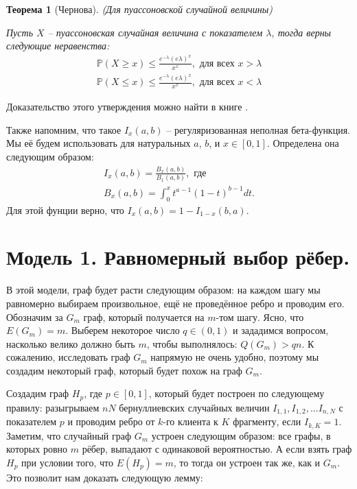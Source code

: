 \documentclass{matmex-diploma-custom}
\newcommand{\PRob}{\mathbb P}
\newcommand{\leqs}{\leqslant}
\newcommand{\geqs}{\geqslant}
\theoremstyle{named}
\newtheorem*{namedtheorem}{Теорема}
\begin{document}
\begin{namedtheorem}[Чернова] (Для пуассоновской случайной величины)

Пусть $X$ -- пуассоновская случайная величина с показателем $\lambda$, тогда верны следующие неравенства:
\begin{align} \label{gr_1}
\PRob(X \geqs x) \leqs \frac{e^{-\lambda}(e\lambda)^x}{x^x}, \text{ для всех } x > \lambda 
\\
\label{gr_2}
\PRob(X \leqs x) \leqs \frac{e^{-\lambda}(e\lambda)^x}{x^x}, \text{ для всех } x < \lambda 
\end{align}
\end{namedtheorem}
Доказательство этого утверждения можно найти в книге \cite{chernov_gr}.

\medskip

Также напомним, что такое $I_x(a,b)$ -- регуляризованная неполная бета-функция. 
Мы её будем использовать для натуральных $a$, $b$, и $x \in [0,1]$.
Определена она следующим образом:
\begin{equation} \label{i_x} \begin{aligned}
I_x(a,b) = \frac{B_x(a,b)}{B_1(a,b)}, \text{ где } 
\\
B_x(a,b) = \int_0^x t^{a-1} (1-t)^{b-1} dt.
\end{aligned}\end{equation}
Для этой фунции верно, что $I_x(a,b) = 1 - I_{1-x}(b, a)$.


\newpage
\section*{Модель 1. Равномерный выбор рёбер.}
В этой модели, граф будет расти следующим образом: на каждом шагу мы равномерно выбираем произвольное, ещё не проведённое ребро 
и проводим его. Обозначим за $G_m$ граф, который получается на $m$-том шагу. Ясно, что $E(G_m) = m$.
Выберем некоторое число $q \in (0, 1)$ и зададимся вопросом, насколько велико должно быть $m$, чтобы выполнялось: $Q(G_m) > qn$.
К сожалению, исследовать граф $G_m$ напрямую не очень удобно, поэтому мы создадим некоторый граф, который будет похож на граф $G_m$.

Создадим граф $H_p$, где $p \in [0, 1]$, который будет построен по следующему правилу: 
разыгрываем $nN$ бернуллиевских случайных величин $I_{1,1}, I_{1,2}, \dots I_{n,N}$ с показателем $p$ и проводим ребро от $k$-го клиента к $K$ фрагменту, 
если $I_{k, K} = 1$.
Заметим, что случайный граф $G_m$ устроен следующим образом: все графы, в которых ровно $m$ рёбер, выпадают с одинаковой вероятностью.
А если взять граф $H_p$ при условии того, что $E(H_p) = m$, то тогда он устроен так же, как и $G_m$.
Это позволит нам доказать следующую лемму:
\end{document}
